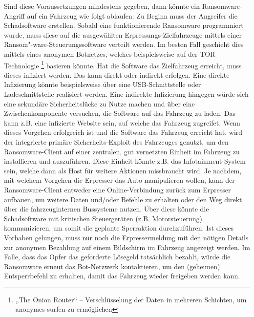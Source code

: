 Sind diese Voraussetzungen mindestens gegeben, dann könnte ein Ransomware-Angriff auf ein 
Fahrzeug wie folgt ablaufen:
\newline
\newline
Zu Beginn muss der Angreifer die Schadsoftware erstellen. Sobald eine funktionierende 
Ransomware programmiert wurde, muss diese auf die ausgewählten Erpressungs-Zielfahrzeuge 
mittels einer Ransom"-ware-Steuerungssoftware verteilt werden. Im besten Fall geschieht dies 
mittels eines anonymen Botnetzes, welches beispielsweise auf der TOR-Technologie 
\footnote{„The Onion Router“ – Verschlüsselung der Daten in mehreren Schichten, um anonymes 
surfen zu ermöglichen} basieren könnte. 
\newline
Hat die Software das Zielfahrzeug erreicht, muss dieses infiziert werden. Das kann direkt oder  
indirekt erfolgen.
\newline
Eine direkte Infizierung könnte beispielsweise über eine USB-Schnittstelle oder Ladeschnittstelle 
realisiert werden. Eine indirekte Infizierung hingegen würde sich eine sekundäre Sicherheitslücke zu Nutze 
machen und über eine Zwischenkomponente versuchen, die Software auf das Fahrzeug zu laden. 
Das kann z.B. eine infizierte Website sein, auf welche das Fahrzeug zugreifet.
\newline
Wenn dieses Vorgehen erfolgreich ist und die Software das Fahrzeug erreicht hat, wird 
der integrierte primäre Sicherheits-Exploit des Fahrzeuges genutzt, um den Ransomware-Client auf 
einer zentralen, gut vernetzten Einheit im Fahrzeug zu installieren und auszuführen. Diese Einheit 
könnte z.B. das Infotainment-System sein, welche dann als Host für weitere Aktionen missbraucht 
wird.
\newline
Je nachdem, mit welchem Vorgehen die Erpresser das Auto manipulieren wollen, kann der 
Ransomware-Client entweder eine Online-Verbindung zurück zum Erpresser aufbauen, um weitere 
Daten und/oder Befehle zu erhalten oder den Weg direkt über die fahrzeuginternen Bussysteme nutzen. 
Über diese könnte die Schadsoftware mit kritischen Steuergeräten (z.B. Motorsteuerung) 
kommunizieren, um somit die geplante Sperraktion durchzuführen. 
\newline
Ist dieses Vorhaben gelungen, muss nur noch die Erpressermeldung mit den 
nötigen Details zur anonymen Bezahlung auf einem Bildschirm im Fahrzeug angezeigt werden. 
Im Falle, dass das Opfer das geforderte Lösegeld tatsächlich bezahlt, würde die Ransomware 
erneut das Bot-Netzwerk kontaktieren, um den (geheimen) Entsperrbefehl zu erhalten, damit  
das Fahrzeug wieder freigeben werden kann.
